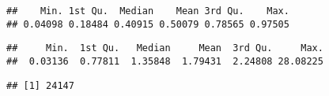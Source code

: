 \documentclass[
]{article}
\newenvironment{Shaded}{\begin{snugshade}}{\end{snugshade}}
\newcommand{\CommentTok}[1]{\textcolor[rgb]{0.56,0.35,0.01}{\textit{#1}}}
\newcommand{\DecValTok}[1]{\textcolor[rgb]{0.00,0.00,0.81}{#1}}
\newcommand{\KeywordTok}[1]{\textcolor[rgb]{0.13,0.29,0.53}{\textbf{#1}}}
\newcommand{\NormalTok}[1]{#1}
\newcommand{\OperatorTok}[1]{\textcolor[rgb]{0.81,0.36,0.00}{\textbf{#1}}}
\newcommand{\StringTok}[1]{\textcolor[rgb]{0.31,0.60,0.02}{#1}}
\begin{document}
\begin{verbatim}
##    Min. 1st Qu.  Median    Mean 3rd Qu.    Max. 
## 0.04098 0.18484 0.40915 0.50079 0.78565 0.97505
\end{verbatim}

\begin{Shaded}
\end{Shaded}

\begin{verbatim}
##     Min.  1st Qu.   Median     Mean  3rd Qu.     Max. 
##  0.03136  0.77811  1.35848  1.79431  2.24808 28.08225
\end{verbatim}

\begin{Shaded}
\end{Shaded}

\begin{verbatim}
## [1] 24147
\end{verbatim}
\end{document}
